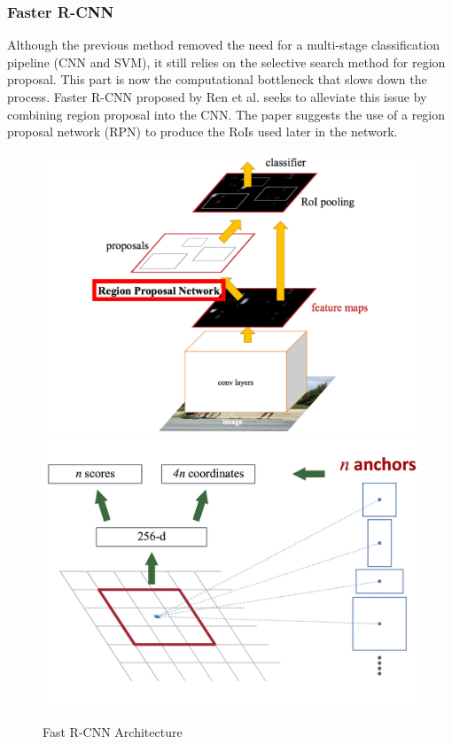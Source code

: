 \documentclass[a4paper,11pt,notitlepage]{article}
\begin{document}
\subsubsection{Faster R-CNN} \label{Faster_rcnn}
Although the previous method \cite{DBLP:journals/corr/Girshick15} removed the need for a multi-stage classification pipeline (CNN and SVM), it still relies on the selective search \cite{Uijlings2013} method for region proposal. This part is now the computational bottleneck that slows down the process. Faster R-CNN proposed by Ren et al. \cite{DBLP:journals/corr/RenHG015} seeks to alleviate this issue by combining region proposal into the CNN. The paper suggests the use of a region proposal network (RPN) to produce the RoIs used later in the network. 

\noindent \begin{figure}[h!]
\includegraphics[width = 0.45\hsize]{./figures/faster.png}
\includegraphics[width = 0.45\hsize]{./figures/rpn_faster.jpg}
\caption{Fast R-CNN Architecture \cite{DBLP:journals/corr/Girshick15}}
\label{Faster_rnn_fig}
\end{figure}
\end{document}
